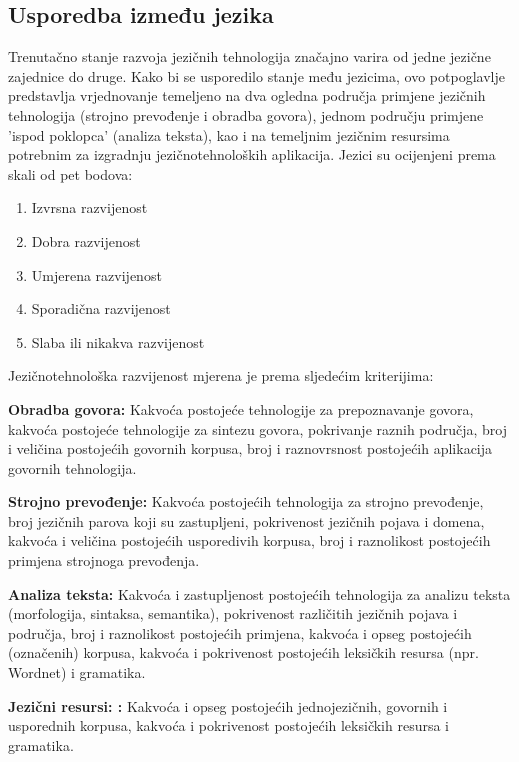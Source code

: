 \begin{multicols}{2}
\subsection{Usporedba između jezika}

Trenutačno stanje razvoja jezičnih tehnologija značajno varira od jedne jezične zajednice do druge. Kako bi se usporedilo stanje među jezicima, ovo potpoglavlje predstavlja vrjednovanje temeljeno na dva ogledna područja primjene jezičnih tehnologija (strojno prevođenje i obradba govora), jednom području primjene 'ispod poklopca' (analiza teksta), kao i na temeljnim jezičnim resursima potrebnim za izgradnju jezičnotehnoloških aplikacija. Jezici su ocijenjeni prema skali od pet bodova:

\begin{enumerate}
\item Izvrsna razvijenost
\item Dobra razvijenost
\item Umjerena razvijenost
\item Sporadična razvijenost
\item Slaba ili nikakva razvijenost
\end{enumerate}

Jezičnotehnološka razvijenost mjerena je prema sljedećim kriterijima:

\smallskip
\textbf{Obradba govora:} Kakvoća postojeće tehnologije za prepoznavanje govora, kakvoća postojeće tehnologije za sintezu govora, pokrivanje raznih područja, broj i veličina postojećih govornih korpusa, broj i raznovrsnost postojećih aplikacija govornih tehnologija.

\textbf{Strojno prevođenje:} Kakvoća postojećih tehnologija za strojno prevođenje, broj jezičnih parova koji su zastupljeni, pokrivenost jezičnih pojava i domena, kakvoća i veličina postojećih usporedivih korpusa, broj i raznolikost postojećih primjena strojnoga prevođenja.

\textbf{Analiza teksta:} Kakvoća i zastupljenost postojećih tehnologija za analizu teksta (morfologija, sintaksa, semantika), pokrivenost različitih jezičnih pojava i područja, broj i raznolikost postojećih primjena, kakvoća i opseg postojećih (označenih) korpusa, kakvoća i pokrivenost postojećih leksičkih resursa (npr. Wordnet) i gramatika.

\textbf{Jezični resursi: :} Kakvoća i opseg postojećih jednojezičnih, govornih i usporednih korpusa, kakvoća i pokrivenost postojećih leksičkih resursa i gramatika.
\vfill


\end{multicols}
